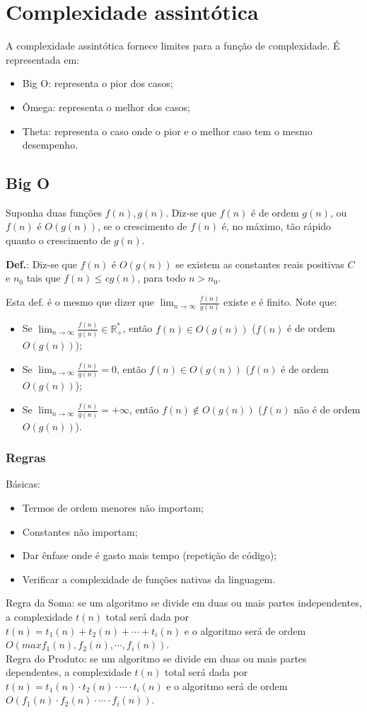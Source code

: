 \section{Complexidade assintótica}

A complexidade assintótica fornece limites para a função de complexidade. É representada em:
\begin{itemize}
  \item Big O: representa o pior dos casos;
  \item Ômega: representa o melhor dos casos;
  \item Theta: representa o caso onde o pior e o melhor caso tem o mesmo desempenho.
\end{itemize}

\subsection{Big O}
Suponha duas funções $f(n), g(n)$. Diz-se que $f(n)$ é de ordem $g(n)$, ou $f(n)$ é $O(g(n))$, se o crescimento de $f(n)$ é, no máximo, tão rápido quanto o crescimento de $g(n)$.

\textbf{Def.}: Diz-se que $f(n)$ é $O(g(n))$ se existem as constantes reais positivas $C$ e $n_0$ tais que $f(n) \le cg(n)$, para todo $n > n_0$.

Esta def. é o mesmo que dizer que $\lim_{n\to\infty} \frac{f(n)}{g(n)}$ existe e é finito. Note que:
\begin{itemize}
  \item Se $\lim_{n\to\infty} \frac{f(n)}{g(n)} \in \mathbb{R}^*_+$, então $f(n) \in O(g(n))$ ($f(n)$ é de ordem $O(g(n))$); 
  \item Se $\lim_{n\to\infty} \frac{f(n)}{g(n)} = 0$, então $f(n) \in O(g(n))$ ($f(n)$ é de ordem $O(g(n))$); 
  \item Se $\lim_{n\to\infty} \frac{f(n)}{g(n)} = +\infty$, então $f(n) \notin O(g(n))$ ($f(n)$ não é de ordem $O(g(n))$). 
\end{itemize}

\subsubsection{Regras}
Básicas:
\begin{itemize}
  \item Termos de ordem menores não importam;
  \item Constantes não importam;
  \item Dar ênfase onde é gasto mais tempo (repetição de código);
  \item Verificar a complexidade de funções nativas da linguagem.
\end{itemize}

Regra da Soma: se um algoritmo se divide em duas ou mais partes independentes, a complexidade $t(n)$ total será dada por $t(n) = t_1(n) + t_2(n) + \cdots + t_{i}(n)$ e o algoritmo será de ordem $O(max{f_1(n), f_2(n), \cdots, f_i(n)})$. \\ 

Regra do Produto: se um algoritmo se divide em duas ou mais partes dependentes, a complexidade $t(n)$ total será dada por $t(n) = t_1(n) \cdot t_2(n) \cdot \cdots \cdot t_{i}(n)$ e o algoritmo será de ordem $O(f_1(n) \cdot f_2(n) \cdot \cdots \cdot f_i(n))$. 
